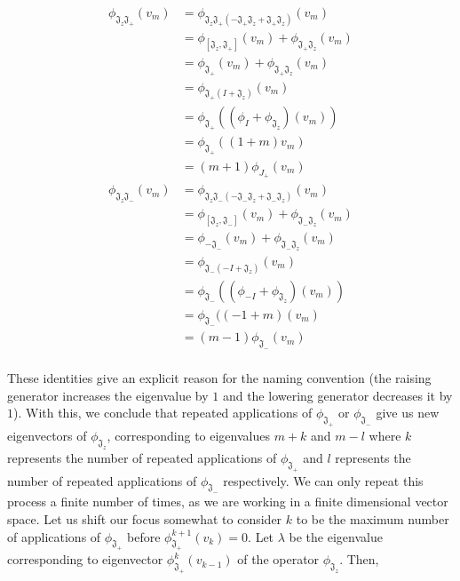 \documentclass[10pt]{ucthesis}
\begin{document}
\begin{equation}
	\begin{aligned}
		\phi_{\mathfrak{J}_z\mathfrak{J}_+}(v_m) &= \phi_{\mathfrak{J}_z\mathfrak{J}_+ (-\mathfrak{J}_+\mathfrak{J}_z + \mathfrak{J}_+\mathfrak{J}_z)}(v_m) \\
					&= \phi_{[\mathfrak{J}_z,\mathfrak{J}_+]}(v_m) + \phi_{\mathfrak{J}_+\mathfrak{J}_z}(v_m) \\
					&= \phi_{\mathfrak{J}_+}(v_m) + \phi_{\mathfrak{J}_+\mathfrak{J}_z}(v_m) \\
					&= \phi_{\mathfrak{J}_+(I + \mathfrak{J}_z)}(v_m) \\					
					&= \phi_{\mathfrak{J}_+}((\phi_{I} + \phi_{\mathfrak{J}_z})(v_m)) \\
					&= \phi_{\mathfrak{J}_+}  ((1+m)v_m) \\
					&= (m + 1)\phi_{J_+}(v_m)
	\end{aligned}
\end{equation} 
\begin{equation}
	\begin{aligned}
		\phi_{\mathfrak{J}_z\mathfrak{J}_-}(v_m) &= \phi_{\mathfrak{J}_z\mathfrak{J}_- (-\mathfrak{J}_-\mathfrak{J}_z + \mathfrak{J}_-\mathfrak{J}_z)}(v_m) \\
&=\phi_{[\mathfrak{J}_z,\mathfrak{J}_- ]}(v_m) + \phi_{\mathfrak{J}_-\mathfrak{J}_z}(v_m)\\
					&= \phi_{-\mathfrak{J}_-}(v_m) + \phi_{\mathfrak{J}_-\mathfrak{J}_z}(v_m)\\
					&= \phi_{\mathfrak{J}_-(-I + \mathfrak{J}_z)}(v_m) \\
					&= \phi_{\mathfrak{J}_-}((\phi_{-I} + \phi_{\mathfrak{J}_z})(v_m)) \\
					&= \phi_{\mathfrak{J}_-} ((-1+m)(v_m) \\
					&= (m - 1)\phi_{\mathfrak{J}_-}(v_m)\\
	\end{aligned}
\end{equation} 

These identities give an explicit reason for the naming convention (the raising generator increases the eigenvalue by $1$ and the lowering generator decreases it by $1$). With this, we conclude that repeated applications of $\phi_{\mathfrak{J}_+}$ or $\phi_{\mathfrak{J}_-}$ give us new eigenvectors of $\phi_{\mathfrak{J}_z}$, corresponding to eigenvalues $m + k$ and $m-l$ where $k$ represents the number of repeated applications of $\phi_{\mathfrak{J}_+}$ and $l$ represents the number of repeated applications of $\phi_{\mathfrak{J}_-}$ respectively. We can only repeat this process a finite number of times, as we are working in a finite dimensional vector space. Let us shift our focus somewhat to consider $k$ to be the maximum number of applications of $\phi_{\mathfrak{J}_+}$ before $\phi_{\mathfrak{J}_+}^{k+1}(v_k) = 0$. Let $\lambda$ be the eigenvalue corresponding to eigenvector $\phi_{\mathfrak{J}_+}^{k}(v_{k-1})$ of the operator $\phi_{\mathfrak{J}_z}$. Then, 
\end{document}

